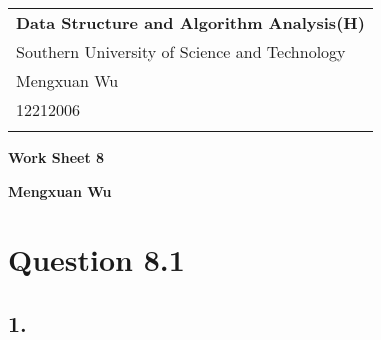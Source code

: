 \documentclass[a4paper,12pt]{article}
\begin{document}
\thispagestyle{empty} %

\begin{tabular}{p{15.5cm}}
{\large \bf Data Structure and Algorithm Analysis(H)} \\
Southern University of Science and Technology \\ Mengxuan Wu \\ 12212006 \\
\hline
\\
\end{tabular}

\vspace*{0.3cm} %

\begin{center}
	{\Large \bf Work Sheet 8}
	\vspace{2mm}

	{\bf Mengxuan Wu}
		
\end{center}  

\vspace{0.4cm}

\section*{Question 8.1}

\subsection*{1.}
\end{document}
